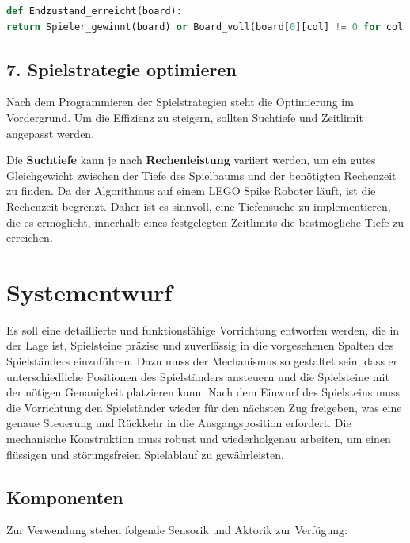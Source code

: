 \begin{lstlisting}[language=Python, caption=Erkennung des Endzustands]
def Endzustand_erreicht(board):
return Spieler_gewinnt(board) or Board_voll(board[0][col] != 0 for col in range(7))
\end{lstlisting}

\section*{7. Spielstrategie optimieren}

Nach dem Programmieren der Spielstrategien steht die Optimierung im Vordergrund. Um die Effizienz zu steigern, sollten Suchtiefe und Zeitlimit angepasst werden.

Die \textbf{Suchtiefe} kann je nach \textbf{Rechenleistung} variiert werden, um ein gutes Gleichgewicht zwischen der Tiefe des Spielbaums und der benötigten Rechenzeit zu finden. Da der Algorithmus auf einem LEGO Spike Roboter läuft, ist die Rechenzeit begrenzt. Daher ist es sinnvoll, eine Tiefensuche zu implementieren, die es ermöglicht, innerhalb eines festgelegten Zeitlimits die bestmögliche Tiefe zu erreichen. 







\chapter{Systementwurf}

Es soll eine detaillierte und funktionsfähige Vorrichtung entworfen werden, die in der Lage ist, Spielsteine präzise und zuverlässig in die vorgesehenen Spalten des Spielständers einzuführen. Dazu muss der Mechanismus so gestaltet sein, dass er unterschiedliche Positionen des Spielständers ansteuern und die Spielsteine mit der nötigen Genauigkeit platzieren kann. Nach dem Einwurf des Spielsteins muss die Vorrichtung den Spielständer wieder für den nächsten Zug freigeben, was eine genaue Steuerung und Rückkehr in die Ausgangsposition erfordert. Die mechanische Konstruktion muss robust und wiederholgenau arbeiten, um einen flüssigen und störungsfreien Spielablauf zu gewährleisten.


\section{Komponenten}
Zur Verwendung stehen folgende Sensorik und Aktorik zur Verfügung:


